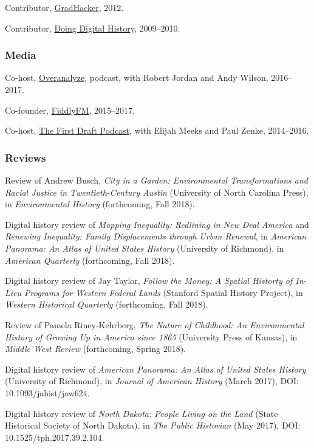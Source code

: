 Contributor,
\href{https://www.insidehighered.com/blogs/gradhacker}{GradHacker},
2012.

Contributor, \href{http://digitalhistory.unl.edu/}{Doing Digital
History}, 2009--2010.

\subsubsection{Media}\label{media}

Co-host, \href{http://overanalyze.fireside.fm}{Overanalyze}, podcast,
with Robert Jordan and Andy Wilson, 2016--2017.

Co-founder, \href{http://fiddly.fm}{FiddlyFM}, 2015--2017.

Co-host, \href{http://www.fiddly.fm/firstdraft/}{The First Draft
Podcast}, with Elijah Meeks and Paul Zenke, 2014--2016.

\subsubsection{Reviews}\label{reviews}

Review of Andrew Busch, \emph{City in a Garden: Environmental
Transformations and Racial Justice in Twentieth-Century Austin}
(University of North Carolina Press), in \emph{Environmental History}
(forthcoming, Fall 2018).

Digital history review of \emph{Mapping Inequality: Redlining in New
Deal America} and \emph{Renewing Inequality: Family Displacements
through Urban Renewal}, in \emph{American Panorama: An Atlas of United
States History} (University of Richmond), in \emph{American Quarterly}
(forthcoming, Fall 2018).

Digital history review of Jay Taylor, \emph{Follow the Money: A Spatial
Historty of In-Lieu Programs for Western Federal Lands} (Stanford
Spatial History Project), in \emph{Western Historical Quarterly}
(forthcoming, Fall 2018).

Review of Pamela Riney-Kehrberg, \emph{The Nature of Childhood: An
Environmental History of Growing Up in America since 1865} (University
Press of Kansas), in \emph{Middle West Review} (forthcoming, Spring
2018).

Digital history review of \emph{American Panorama: An Atlas of United
States History} (University of Richmond), in \emph{Journal of American
History} (March 2017), DOI: 10.1093/jahist/jaw624.

Digital history review of \emph{North Dakota: People Living on the Land}
(State Historical Society of North Dakota), in \emph{The Public
Historian} (May 2017), DOI: 10.1525/tph.2017.39.2.104.

